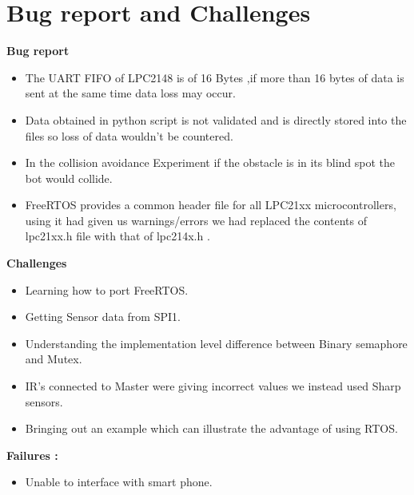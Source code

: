 \documentclass[a4paper,12pt,oneside]{book}
\begin{document}
\section{Bug report and Challenges}
\large{\textbf{Bug report}}
\begin{itemize}
  \item The UART FIFO of LPC2148 is of 16 Bytes ,if more than 16 bytes of data is sent at the same time data loss may occur.
  \\
  \item Data obtained in python script is not validated and is directly stored into the files so loss of data wouldn't be countered.
  \\
  \item In the collision avoidance Experiment if the obstacle is in its blind spot the bot would collide.
  \\
  \item FreeRTOS provides a common header file for all LPC21xx microcontrollers, using it had given us warnings/errors we had replaced the contents of lpc21xx.h file with that of lpc214x.h .
    \end{itemize}
\newline
  \large{\textbf{Challenges}}
  \begin{itemize}
  
  \item Learning how to port FreeRTOS.
  \item Getting Sensor data from SPI1.
  \item Understanding the implementation level difference between Binary semaphore and Mutex.
  \item IR's connected to Master were giving incorrect values we instead used Sharp sensors.
  \item Bringing out an example which can illustrate the advantage of using RTOS.
  \end{itemize}
 \newline 
 \large{\textbf{Failures :}}
 \begin{itemize}
  
 \item Unable to interface with smart phone.
 
\end{itemize}
\end{document}
